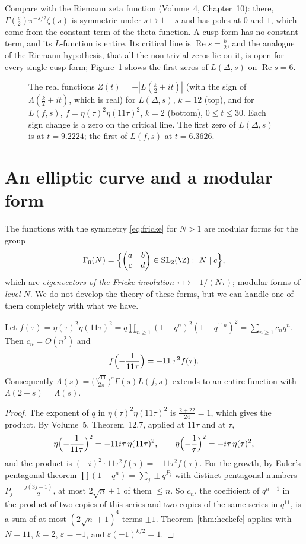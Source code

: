 Compare with the Riemann zeta function (Volume~4, Chapter~10): there, $\Gamma(\frac s2)\pi^{-s/2}\zeta(s)$ is symmetric under $s\mapsto1-s$ and has poles at $0$ and $1$, which come from the constant
term of the theta function. A cusp form has no constant term, and its $L$-function is entire. Its critical line is $\operatorname{Re}s=\frac k2$, and the analogue of
the Riemann hypothesis, that all the non-trivial zeros lie on it, is open for every single cusp form; Figure~\ref{fig:hardy} shows the first zeros of $L(\Delta,s)$ on
$\operatorname{Re}s=6$.

\begin{figure}[ht]
\centering{}
\caption{The real functions $Z(t)=\pm|L(\frac k2+it)|$ (with the sign of $\Lambda(\frac k2+it)$, which is real) for $L(\Delta,s)$, $k=12$ (top), and for $L(f,s)$,
$f=\eta(\tau)^2\eta(11\tau)^2$, $k=2$ (bottom), $0\le t\le30$. Each sign change is a zero on the critical line. The first zero of $L(\Delta,s)$ is at $t=9.2224$;
the first of $L(f,s)$ at $t=6.3626$.}
\label{fig:hardy}
\end{figure}

\section{An elliptic curve and a modular form}

The functions with the symmetry \eqref{eq:fricke} for $N>1$ are modular forms for the group
\[
\Gamma_0(N)=\Bigl\{\begin{pmatrix}a&b\\c&d\end{pmatrix}\in\mathrm{SL}_2(\Z):\ N\mid c\Bigr\},
\]
which are \emph{eigenvectors of the Fricke involution} $\tau\mapsto-1/(N\tau)$; modular forms of \emph{level $N$}. We do not develop the theory of these forms, but
we can handle one of them completely with what we have.

\begin{proposition}\label{prop:eta11}
Let $f(\tau)=\eta(\tau)^2\eta(11\tau)^2=q\prod_{n\ge1}(1-q^n)^2(1-q^{11n})^2=\sum_{n\ge1}c_nq^n$. Then $c_n=O(n^2)$ and
\[
f\Bigl(-\frac1{11\tau}\Bigr)=-11\,\tau^2f(\tau).
\]
Consequently $\Lambda(s)=\bigl(\frac{\sqrt{11}}{2\pi}\bigr)^s\Gamma(s)L(f,s)$ extends to an entire function with $\Lambda(2-s)=\Lambda(s)$.
\end{proposition}
\begin{proof}
The exponent of $q$ in $\eta(\tau)^2\eta(11\tau)^2$ is $\frac{2+22}{24}=1$, which gives the product. By Volume~5, Theorem~12.7, applied at $11\tau$ and at $\tau$,
\[
\eta\Bigl(-\frac1{11\tau}\Bigr)^2=-11i\tau\,\eta(11\tau)^2,\qquad\eta\Bigl(-\frac1\tau\Bigr)^2=-i\tau\,\eta(\tau)^2,
\]
and the product is $(-i)^2\cdot11\tau^2f(\tau)=-11\tau^2f(\tau)$. For the growth, by Euler's pentagonal theorem $\prod(1-q^n)=\sum_j\pm q^{P_j}$ with distinct pentagonal
numbers $P_j=\frac{j(3j-1)}2$, at most $2\sqrt n+1$ of them $\le n$. So $c_n$, the coefficient of $q^{n-1}$ in the product of two copies of this series and two copies of
the same series in $q^{11}$, is a sum of at most $(2\sqrt n+1)^4$ terms $\pm1$. Theorem~\ref{thm:heckefe} applies with $N=11$, $k=2$, $\varepsilon=-1$, and
$\varepsilon(-1)^{k/2}=1$.
\end{proof}

